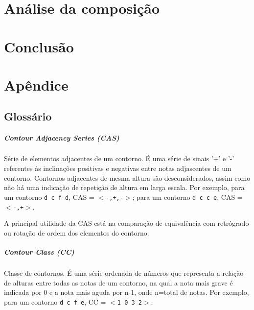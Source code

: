 \documentclass[12pt,brazil]{book}
\begin{document}
\chapter{Análise da composição}
\label{cha:anal-da-comp}

\chapter{Conclusão}
\label{cha:conclusao}





\chapter{Apêndice}
\label{cha:apendice}

\section{Glossário}
\label{sec:glossario}

\paragraph{Contour Adjacency Series (CAS)}
\label{sec:cont-adjac-seri}

Série de elementos adjacentes de um contorno. É uma série de sinais
'+' e '-' referentes às inclinações positivas e negativas entre notas
adjascentes de um contorno. Contornos adjacentes de mesma altura são
desconsiderados, assim como não há uma indicação de repetição de
altura em larga escala. Por exemplo, para um contorno \texttt{d c f
  d}, CAS = \texttt{$<$-,+,-$>$}; para um contorno \texttt{d c c e}, CAS =
\texttt{$<$-,+$>$}.

A principal utilidade da CAS está na comparação de equivalência com
retrógrado ou rotação de ordem dos elementos do contorno.

\paragraph{Contour Class (CC)}
\label{sec:contour-class-cc}

Classe de contornos. É uma série ordenada de números que representa a
relação de alturas entre todas as notas de um contorno, na qual a nota
mais grave é indicada por 0 e a nota mais aguda por n-1, onde n=total
de notas. Por exemplo, para um contorno \texttt{d c f e}, CC = \texttt{$<$1 0
3 2$>$}.
\end{document}
